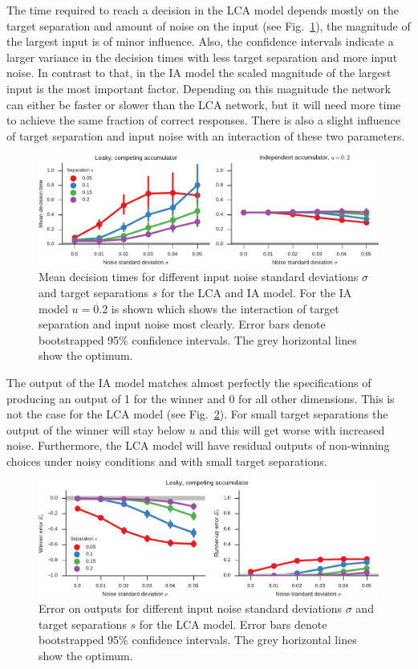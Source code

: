 \documentclass[10pt,letterpaper]{article}
\begin{document}
The time required to reach a decision in the LCA model depends mostly on the 
target separation and amount of noise on the input (see Fig.~\ref{fig:time}), 
the magnitude of the largest input is of minor influence. Also, the confidence 
intervals indicate a larger variance in the decision times with less target 
separation and more input noise. In contrast to that, in the IA model the scaled 
magnitude of the largest input is the most important factor.  Depending on this 
magnitude the network can either be faster or slower than the LCA network, but 
it will need more time to achieve the same fraction of correct responses.  There 
is also a slight influence of target separation and input noise with an 
interaction of these two parameters.
\begin{figure}
    \centering
    \includegraphics{figures/time}
    \caption{Mean decision times for different input noise standard deviations 
        $\sigma$ and target separations $s$ for the LCA and IA model. For the IA 
        model $u = 0.2$ is shown which shows the interaction of target 
        separation and input noise most clearly. Error bars denote bootstrapped 
        95\% confidence intervals.  The grey horizontal lines show the 
        optimum.}\label{fig:time}
\end{figure}

The output of the IA model matches almost perfectly the specifications of 
producing an output of 1 for the winner and 0 for all other dimensions.  This is 
not the case for the LCA model (see Fig.~\ref{fig:error}).  For small target 
separations the output of the winner will stay below $u$ and this will get worse 
with increased noise. Furthermore, the LCA model will have residual outputs of 
non-winning choices under noisy conditions and with small target separations.
\begin{figure}
    \centering
    \includegraphics{figures/error}
    \caption{Error on outputs for different input noise standard deviations 
        $\sigma$ and target separations $s$ for the LCA model.  Error bars 
        denote bootstrapped 95\% confidence intervals. The grey horizontal lines 
        show the optimum.}\label{fig:error}
\end{figure}
\end{document}
